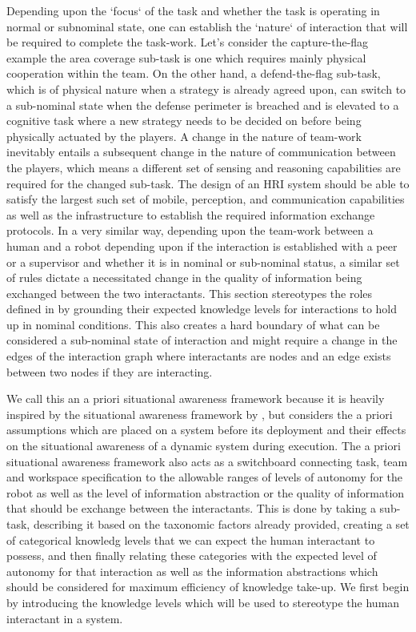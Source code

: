 \documentclass[letterpaper, 10 pt, conference]{ieeeconf} %
\begin{document}
Depending upon the `focus` of the task and whether the task is operating in normal or subnominal
state, one can establish the `nature` of interaction that will be required to complete the
task-work. Let's consider the capture-the-flag example the area coverage sub-task is one which
requires mainly physical cooperation within the team. On the other hand, a defend-the-flag sub-task,
which is of physical nature when a strategy is already agreed upon, can switch to a sub-nominal
state when the defense perimeter is breached and is elevated to a cognitive task where a new
strategy needs to be decided on before being physically actuated by the players. A change in the
nature of team-work inevitably entails a subsequent change in the nature of communication between
the players, which means a different set of sensing and reasoning capabilities are required for the
changed sub-task. The design of an HRI system should be able to satisfy the largest such set of
mobile, perception, and communication capabilities as well as the infrastructure to establish the
required information exchange protocols. In a very similar way, depending upon the team-work between
a human and a robot depending upon if the interaction is established with a peer or a supervisor and
whether it is in nominal or sub-nominal status, a similar set of rules dictate a necessitated change
in the quality of information being exchanged between the two interactants. This section stereotypes
the roles defined in \citet{Goodrich2007,Scholtz2003} by grounding their expected knowledge levels
for interactions to hold up in nominal conditions. This also creates a hard boundary of what can be
considered a sub-nominal state of interaction and might require a change in the edges of the
interaction graph where interactants are nodes and an edge exists between two nodes if they are
interacting.

We call this an a priori situational awareness framework because it is heavily inspired by the
situational awareness framework by \citet{Endsley1995}, but considers the a priori assumptions which
are placed on a system before its deployment and their effects on the situational awareness of a
dynamic system during execution. The a priori situational awareness framework also acts as a
switchboard connecting task, team and workspace specification to the allowable ranges of levels of
autonomy for the robot as well as the level of information abstraction or the quality of information
that should be exchange between the interactants. This is done by taking a sub-task, describing it
based on the taxonomic factors already provided, creating a set of categorical knowledg levels that
we can expect the human interactant to possess, and then finally relating these categories with the
expected level of autonomy for that interaction as well as the information abstractions which should
be considered for maximum efficiency of knowledge take-up. We first begin by introducing the
knowledge levels which will be used to stereotype the human interactant in a system.
\end{document}
